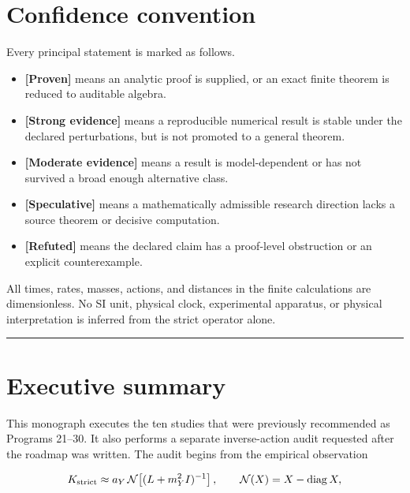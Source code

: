 \documentclass[11pt,a4paper,openany]{report}
\newcommand{\statusProven}{\textcolor{fingreen}{[Proven]}}
\newcommand{\statusStrong}{\textcolor{finblue}{[Strong evidence]}}
\newcommand{\statusModerate}{\textcolor{finviolet}{[Moderate evidence]}}
\newcommand{\statusSpeculative}{\textcolor{finorange}{[Speculative]}}
\newcommand{\statusRefuted}{\textcolor{finred}{[Refuted]}}
\begin{document}
\tableofcontents
\clearpage
{}

\chapter*{Confidence convention}

Every principal statement is marked as follows.

\begin{itemize}
\item 
\textbf{\statusProven{}} means an analytic proof is supplied, or an exact finite theorem is reduced to auditable algebra.

\item 
\textbf{\statusStrong{}} means a reproducible numerical result is stable under the declared perturbations, but is not promoted to a general theorem.

\item 
\textbf{\statusModerate{}} means a result is model-dependent or has not survived a broad enough alternative class.

\item 
\textbf{\statusSpeculative{}} means a mathematically admissible research direction lacks a source theorem or decisive computation.

\item 
\textbf{\statusRefuted{}} means the declared claim has a proof-level obstruction or an explicit counterexample.

\end{itemize}

All times, rates, masses, actions, and distances in the finite calculations are dimensionless. No SI unit, physical clock, experimental apparatus, or physical interpretation is inferred from the strict operator alone.

\par\medskip\hrule\medskip

\chapter{Executive summary}

This monograph executes the ten studies that were previously recommended as Programs 21–30. It also performs a separate inverse-action audit requested after the roadmap was written. The audit begins from the empirical observation

\[
K_{\rm strict}\approx a_Y\,\mathcal N\!\left[(L+m_Y^2I)^{-1}\right],
\qquad
\mathcal N(X)=X-\operatorname{diag}X,
\]
\end{document}
